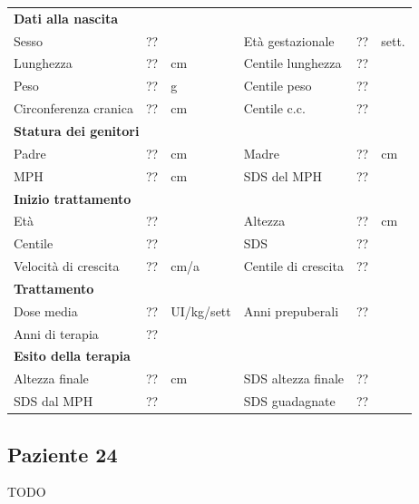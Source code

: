 \begin{table}[!h]
\begin{tabular}{lrllrl}
\toprule
\multicolumn{6}{l}{\textbf{Dati alla nascita}}\\
Sesso 		& \multicolumn{2}{l}{??} 	& Età gestazionale 		& ?? 		& sett.\\
Lunghezza 	& ?? 		& cm 				& Centile lunghezza		& ?? 		\\
Peso 		& ?? 		& g					& Centile peso			& ?? 		\\
Circonferenza cranica	& ?? 		& cm 	& Centile c.c.			& ?? \\
\midrule
\multicolumn{6}{l}{\textbf{Statura dei genitori}}\\
Padre 		& ?? & cm 	& Madre 				& ?? & cm \\
MPH 		& ?? & cm 	& SDS del MPH 			& ??\\
\midrule
\multicolumn{6}{l}{\textbf{Inizio trattamento}} \\
Età	& ?? & 		& Altezza 				& ?? & cm  \\
Centile & ?? 	 &		& SDS		& ?? \\
Velocità di crescita & ?? & cm/a	& Centile di crescita & ??\\
\midrule
\multicolumn{6}{l}{\textbf{Trattamento}} \\
Dose media		& ?? & UI/kg/sett & Anni prepuberali & ??\\
Anni di terapia & ??\\
\midrule
\multicolumn{6}{l}{\textbf{Esito della terapia}} \\
Altezza finale			& ?? & cm 	& SDS altezza finale		& ??\\
SDS dal MPH				& ?? &		& SDS guadagnate 			& ??\\
\bottomrule
\end{tabular}
\end{table}
\clearpage


\subsection*{Paziente 24}

TODO

